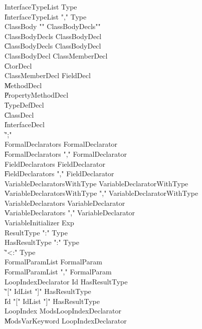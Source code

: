 \begin{grammar}
 InterfaceTypeList  \:   Type\\
    \|   InterfaceTypeList  \xcd","  Type\\
 ClassBody  \:   \xcd"{"  ClassBodyDecls\opt  \xcd"}"\\
 ClassBodyDecls  \:   ClassBodyDecl\\
    \|   ClassBodyDecls  ClassBodyDecl\\
 ClassBodyDecl  \:   ClassMemberDecl\\
    \|   CtorDecl\\
 ClassMemberDecl  \:   FieldDecl\\
    \|   MethodDecl\\
    \|   PropertyMethodDecl\\
    \|   TypeDefDecl\\
    \|   ClassDecl\\
    \|   InterfaceDecl\\
    \|   \xcd";"\\
 FormalDeclarators  \:   FormalDeclarator\\
    \|   FormalDeclarators  \xcd","  FormalDeclarator\\
 FieldDeclarators  \:   FieldDeclarator\\
    \|   FieldDeclarators  \xcd","  FieldDeclarator\\
 VariableDeclaratorsWithType  \:   VariableDeclaratorWithType\\
    \|   VariableDeclaratorsWithType  \xcd","  VariableDeclaratorWithType\\
 VariableDeclarators  \:   VariableDeclarator\\
    \|   VariableDeclarators  \xcd","  VariableDeclarator\\
 VariableInitializer  \:   Exp\\
 ResultType  \:   \xcd":"  Type\\
 HasResultType  \:   \xcd":"  Type\\
    \|   \xcd"<:"  Type\\
 FormalParamList  \:   FormalParam\\
    \|   FormalParamList  \xcd","  FormalParam\\
 LoopIndexDeclarator  \:   Id  HasResultType\opt\\
    \|   \xcd"["  IdList  \xcd"]"  HasResultType\opt\\
    \|   Id  \xcd"["  IdList  \xcd"]"  HasResultType\opt\\
 LoopIndex  \:   Mods\opt  LoopIndexDeclarator\\
    \|   Mods\opt  VarKeyword  LoopIndexDeclarator\\

\end{grammar}
